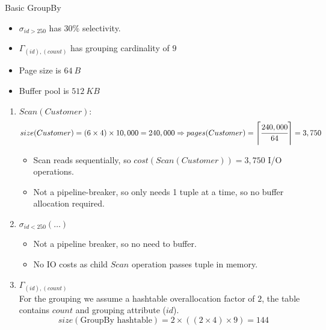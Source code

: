 \begin{examplebox}{Basic GroupBy}
\begin{minipage}{.79\textwidth}
\begin{itemize}
      \item $\sigma_{id > 250}$ has $30\%$ selectivity.
      \item $\Gamma_{(id), (count)}$ has grouping cardinality of $9$
      \item Page size is $64 \ B$
      \item Buffer pool is $512 \ KB$
    \end{itemize}
  \end{minipage}
  \tcblower
  \begin{enumerate}
    \item { $Scan(Customer)$:
          \[size(Customer) = (6 \times 4) \times 10,000 = 240,000 \Rightarrow pages(Customer) = \left\lceil \cfrac{240,000}{64} \right\rceil = 3,750\]
          \begin{itemize}
            \item Scan reads sequentially, so $cost(Scan(Customer)) = 3,750$ I/O operations.
            \item Not a pipeline-breaker, so only needs 1 tuple at a time, so no buffer allocation required.
          \end{itemize}
          }
    \item { $\sigma_{id < 250}(\dots)$
          \begin{itemize}
            \item Not a pipeline breaker, so no need to buffer.
            \item No IO costs as child $Scan$ operation passes tuple in memory.
          \end{itemize}
          }
    \item { $\Gamma_{(id),(count)}$
          \\ For the grouping we assume a hashtable overallocation factor of $2$, the table contains $count$ and grouping attribute ($id$).
          \[size(\text{GroupBy hashtable}) = 2 \times ((2 \times 4) \times 9) = 144\]
          }
  \end{enumerate}
\end{examplebox}

